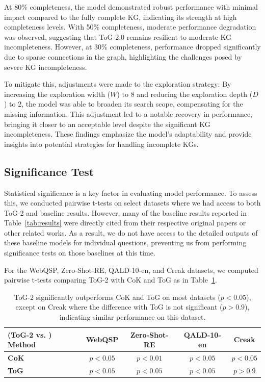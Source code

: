 \documentclass{article} %
\begin{document}
At 80\% completeness, the model demonstrated robust performance with minimal impact compared to the fully complete KG, indicating its strength at high completeness levels. With 50\% completeness, moderate performance degradation was observed, suggesting that ToG-2.0 remains resilient to moderate KG incompleteness. However, at 30\% completeness, performance dropped significantly due to sparse connections in the graph, highlighting the challenges posed by severe KG incompleteness.

To mitigate this, adjustments were made to the exploration strategy: By increasing the exploration width ($W$) to 8 and reducing the exploration depth ($D$) to 2, the model was able to broaden its search scope, compensating for the missing information. This adjustment led to a notable recovery in performance, bringing it closer to an acceptable level despite the significant KG incompleteness. These findings emphasize the model's adaptability and provide insights into potential strategies for handling incomplete KGs. 
\subsection{Significance Test}
Statistical significance is a key factor in evaluating model performance. To assess this, we conducted pairwise t-tests on select datasets where we had access to both ToG-2 and baseline results. However, many of the baseline results reported in Table~\ref{tab:results} were directly cited from their respective original papers or other related works. As a result, we do not have access to the detailed outputs of these baseline models for individual questions, preventing us from performing significance tests on those baselines at this time.

For the WebQSP, Zero-Shot-RE, QALD-10-en, and Creak datasets, we computed pairwise t-tests comparing ToG-2 with CoK and ToG as in Table~\ref{t-test}.

\begin{table}[ht]
\centering
\begin{tabular}{lcccc}
\toprule
\textbf{(ToG-2 vs. ) Method} & \textbf{WebQSP} & \textbf{Zero-Shot-RE} & \textbf{QALD-10-en} & \textbf{Creak} \\
\midrule
\textbf{CoK} & $p < 0.05$ & $p < 0.01$ & $p < 0.05$ & $p < 0.05$ \\
\textbf{ToG} & $p < 0.05$ & $p < 0.05$ & $p < 0.05$ & $p > 0.9$ \\
\bottomrule
\end{tabular}
\caption{ToG-2 significantly outperforms CoK and ToG on most datasets ($p < 0.05$), except on Creak where the difference with ToG is not significant ($p > 0.9$), indicating similar performance on this dataset. }
\label{t-test}
\end{table}
\end{document}
